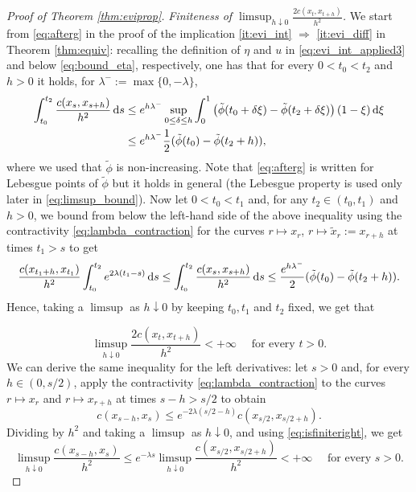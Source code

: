 \documentclass[reqno]{amsart}
\theoremstyle{plain}
\theoremstyle{remark}
\theoremstyle{plain}
\numberwithin{equation}{section}
\theoremstyle{remark}
\newcommand{\de}{{\,\rm d}}
\begin{document}
\begin{proof}[Proof of Theorem \ref{thm:eviprop}]
\textit{Finiteness of $\limsup_{h\downarrow 0}\frac{2c(x_{t},x_{t+h})}{h^2}$.} We start from \eqref{eq:afterg} in the  proof of the implication \ref{it:evi_int} $\Rightarrow$ \ref{it:evi_diff} in Theorem \ref{thm:equiv}: recalling the definition of $\eta$ and $u$ in \eqref{eq:evi_int_applied3} and below \eqref{eq:bound_eta}, respectively,  one has  that for every $0< t_0 < t_2$ and $h>0$ it holds, for $ \lambda^-:=\max\{0,-\lambda\}$,
    \begin{align*}\int_{t_0}^{t_2} \frac{c(x_s,x_{s+h})}{h^2} \de s &\le e^{h \lambda^-} \sup_{0 \le \delta \le h} \int_0^1 \left (\tilde{\phi}(t_0+\delta \xi)-\tilde{\phi}(t_2+\delta \xi) \right)(1-\xi) \de \xi \\
    & \le e^{h \lambda^-} \frac{1}{2}(\tilde{\phi}(t_0)-\tilde{\phi}(t_2+h)), 
    \end{align*}
    where we used that $\tilde{\phi}$ is non-increasing. Note that \eqref{eq:afterg} is written for Lebesgue points of $\tilde{\phi}$ but it holds in general (the Lebesgue property is used only later in \eqref{eq:limsup_bound}). Now let $0<t_0<t_1$ and, for any $t_2 \in (t_0, t_1)$ and $h>0$, we  bound from below the left-hand side of  the above inequality using the contractivity \eqref{eq:lambda_contraction} for the curves $r \mapsto x_r$, $r \mapsto \tilde{x}_r:= x_{r+h}$ at times $t_1>s$ to get
    \begin{equation}\label{eq:tobediv}
       \frac{c(x_{t_1+h}, x_{t_1})}{h^2} \int_{t_0}^{t_2} e^{2\lambda(t_1-s)} \de s  \le \int_{t_0}^{t_2} \frac{c(x_s,x_{s+h})}{h^2}\de s \le \frac{e^{h\lambda^-}}{2}(\tilde{\phi}(t_0)-\tilde{\phi}(t_2+h)).
    \end{equation}
    Hence, taking a $\limsup$ as $h \downarrow 0$  by   keeping $t_0, t_1$ and $t_2$ fixed, we get that 

\begin{equation}\label{eq:isfiniteright}
\limsup_{h\downarrow 0}\frac{2c(x_{t},x_{t+h})}{h^2}<+\infty \quad \text{ for every } t>0.
\end{equation}
We can derive the same inequality for the left derivatives: let $s>0$ and, for every $h \in (0,s/2)$, apply the contractivity \eqref{eq:lambda_contraction} to the curves $r \mapsto x_r$ and $r \mapsto x_{r+h}$ at times $s-h>s/2$ to obtain
\[
c(x_{s-h}, x_s) \le e^{-2\lambda(s/2-h)} c(x_{s/2}, x_{s/2+h}).
\]
Dividing by $h^2$ and taking a $\limsup$ as $h \downarrow 0$, and using \eqref{eq:isfiniteright}, we get
\begin{equation}\label{eq:isfiniteleft}
    \limsup_{h \downarrow 0} \frac{c(x_{s-h}, x_s)}{h^2} \le e^{-\lambda s} \limsup_{h \downarrow 0} \frac{c(x_{s/2}, x_{s/2+h})}{h^2} < + \infty \quad \text{ for every } s>0.
\end{equation}


\end{proof}
\end{document}
